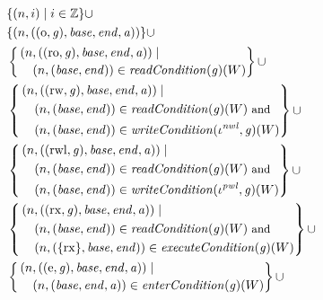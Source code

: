 \documentclass[compsoc,conference,letterpaper,fleqn]{IEEEtran}
\newcommand{\union}{\mathbin{\cup}}
\newcommand{\var}[1]{\mathit{#1}}
\newcommand{\gl}{\var{g}}
\newcommand{\addr}{\var{a}}
\newcommand{\start}{\var{base}}
\newcommand{\addrend}{\var{end}}
\newcommand{\perm}{\var{perm}}
\newcommand{\stdcap}[1][(\perm,\gl)]{\left(#1,\start,\addrend,\addr \right)}
\newcommand{\nwl}{\var{nwl}}
\newcommand{\pwl}{\var{pwl}}
\newcommand{\plainfun}[2]{
  \ifthenelse{\equal{#2}{}}
  {\mathit{#1}}
  {\mathit{#1}(#2)}
}
\newcommand{\readCond}[1]{\plainfun{readCondition}{#1}}
\newcommand{\writeCond}[1]{\plainfun{writeCondition}{#1}}
\newcommand{\execCond}[1]{\plainfun{executeCondition}{#1}}
\newcommand{\entryCond}[1]{\plainfun{enterCondition}{#1}}
\newcommand{\ints}{\mathbb{Z}}
\newcommand{\npair}[2][n]{\left(#1,#2 \right)}
\newcommand{\plainperm}[1]{\mathrm{#1}}
\newcommand{\noperm}{\plainperm{o}}
\newcommand{\readonly}{\plainperm{ro}}
\newcommand{\readwrite}{\plainperm{rw}}
\newcommand{\exec}{\plainperm{rx}}
\newcommand{\entry}{\plainperm{e}}
\newcommand{\readwritel}{\plainperm{rwl}}
\newlength{\oldmathindent}
\newenvironment{withmathindent}[1]{\setlength{\oldmathindent}{\mathindent}\setlength{\mathindent}{#1}}{\setlength{\mathindent}{\oldmathindent}}
\begin{document}
{\begin{figure}[htbp]
\begin{withmathindent}{0cm}
\begin{align*}
      &\;\;\begin{aligned}[t] & \{ \npair{i} \mid i \in \ints \}
        \union \\
        & \{ \npair{\stdcap[(\noperm,\gl)] } \}
        \union \\
        & \left\{
          \begin{multlined}
            \npair{\stdcap[(\readonly,\gl)] } \mid \\
            \npair{(\start,\addrend)} \in \readCond{}(\gl)(W)
          \end{multlined} \right\}
        \union \\
        & \left\{
          \begin{aligned}
            &\npair{\stdcap[(\readwrite,\gl)] } \mid \\
             &\quad\npair{(\start,\addrend)} \in \readCond{}(\gl)(W) \text{\footnotesize{ and }} \\
             &\quad\npair{(\start,\addrend)} \in
            \writeCond{}(\iota^\nwl,\gl)(W)
          \end{aligned} \right\} \union \\
        & \left\{
          \begin{aligned}
            &\npair{\stdcap[(\readwritel,\gl)] } \mid \\
             &\quad\npair{(\start,\addrend)} \in \readCond{}(\gl)(W) \text{\footnotesize{ and }} \\
             &\quad\npair{(\start,\addrend)} \in
            \writeCond{}(\iota^\pwl,\gl)(W)
          \end{aligned} \right\}
        \union \\
        & \left\{
          \begin{aligned}
            &\npair{\stdcap[(\exec,\gl)]} \mid \\
             &\quad\npair{(\start,\addrend)} \in \readCond{}(\gl)(W) \text{\footnotesize{ and }} \\
             &\quad\npair{(\{\exec\},\start,\addrend)} \in \execCond{}(\gl)(W)
          \end{aligned} \right\}
        \union \\
        & \left\{
          \begin{multlined}
            \npair{\stdcap[(\entry,\gl)]} \mid \\
            \npair{(\start,\addrend,\addr)} \in \entryCond{}(\gl)(W)
          \end{multlined} \right\}
        \union \\

\end{aligned}
\end{align*}
\end{withmathindent}
\end{figure}}
\end{document}
